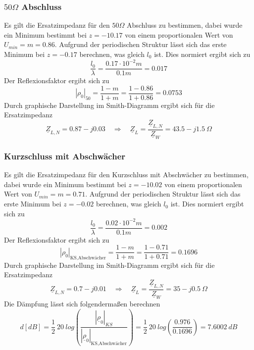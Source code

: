 \documentclass[12pt,a4paper,ngerman]{article}
\begin{document}
\subsubsection{$50\Omega$ Abschluss}
Es gilt die Ersatzimpedanz für den $50\Omega$ Abschluss zu bestimmen, dabei wurde ein Minimum bestimmt bei $z = -10.17$ von einem proportionalen Wert von $U_{min}=m=0.86$. Aufgrund der periodischen Struktur lässt sich das erste Minimum bei $z=-0.17$ berechnen, was gleich $l_0$ ist. Dies normiert ergibt sich zu
\begin{equation}
\frac{l_0}{\lambda} = \frac{0.17 \cdot 10^{-2}m}{0.1m} = 0.017
\end{equation}
Der Reflexionsfaktor ergibt sich zu
\begin{equation}
|\rho_0|_{50} = \frac{1-m}{1+m} = \frac{1-0.86}{1+0.86} = 0.0753
\end{equation}
Durch graphische Darstellung im Smith-Diagramm ergibt sich für die Ersatzimpedanz
\begin{equation}
\underline{Z}_{L,N} = 0.87 - j 0.03 \quad \Rightarrow \quad \underline{Z}_L = \frac{\underline{Z}_{L,N}}{\underline{Z}_W} = 43.5 - j1.5 \ \Omega
\end{equation}

\subsubsection{Kurzschluss mit Abschwächer}
Es gilt die Ersatzimpedanz für den Kurzschluss mit Abschwächer zu bestimmen, dabei wurde ein Minimum bestimmt bei $z = -10.02$ von einem proportionalen Wert von $U_{min}=m=0.71$. Aufgrund der periodischen Struktur lässt sich das erste Minimum bei $z=-0.02$ berechnen, was gleich $l_0$ ist. Dies normiert ergibt sich zu
\begin{equation}
\frac{l_0}{\lambda} = \frac{0.02 \cdot 10^{-2}m}{0.1m} = 0.002
\end{equation}
Der Reflexionsfaktor ergibt sich zu
\begin{equation}
|\rho_0|_{\text{KS,Abschwächer}} = \frac{1-m}{1+m} = \frac{1-0.71}{1+0.71} = 0.1696
\end{equation}
Durch graphische Darstellung im Smith-Diagramm ergibt sich für die Ersatzimpedanz
\begin{equation}
\underline{Z}_{L,N} = 0.7 - j0.01 \quad \Rightarrow \quad \underline{Z}_L = \frac{\underline{Z}_{L,N}}{\underline{Z}_W} = 35-j0.5 \ \Omega
\end{equation}
Die Dämpfung lässt sich folgendermaßen berechnen
\begin{equation}
d[dB] = \frac{1}{2} \ 20 \ log\left( \frac{|\underline{\rho}_0|_{KS}}{|\underline{\rho}_0|_{\text{KS,Abschwächer}}}\right) = \frac{1}{2}\ 20\ log\left( \frac{0.976}{0.1696}\right)= 7.6002 \ dB
\end{equation}
\end{document}
